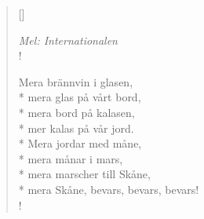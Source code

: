 
\settowidth{\versewidth}{mera marscher till Skåne,}



\begin{verse}[\versewidth]

\flagverse{}
\emph{Mel: Internationalen}\\!

\flagverse{}
Mera brännvin i glasen,\\*
mera glas på vårt bord,\\*
mera bord på kalasen,\\*
mer kalas på vår jord.\\*
Mera jordar med måne,\\*
mera månar i mars,\\*
mera marscher till Skåne,\\*
mera Skåne, bevars, bevars, bevars!\\!




\end{verse}

